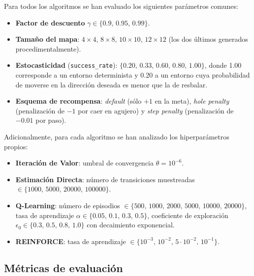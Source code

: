 \documentclass[11pt,a4paper]{article}
\begin{document}
Para todos los algoritmos se han evaluado los siguientes parámetros comunes:
\begin{itemize}
  \item \textbf{Factor de descuento} $\gamma \in \{0.9,\, 0.95,\, 0.99\}$.
  \item \textbf{Tamaño del mapa}: $4\times 4,\, 8\times 8,\, 10\times 10,\, 12\times 12$ (los dos últimos generados procedimentalmente).
  \item \textbf{Estocasticidad} (\texttt{success\_rate}): $\{0.20,\, 0.33,\, 0.60,\, 0.80,\, 1.00\}$, donde 1.00 corresponde a un entorno determinista y 0.20 a un entorno cuya probabilidad de moverse en la dirección deseada es menor que la de resbalar.
  \item \textbf{Esquema de recompensa}: \emph{default} (sólo $+1$ en la meta), \emph{hole penalty} (penalización de $-1$ por caer en agujero) y \emph{step penalty} (penalización de $-0.01$ por paso).
\end{itemize}
Adicionalmente, para cada algoritmo se han analizado los hiperparámetros propios:
\begin{itemize}
  \item \textbf{Iteración de Valor}: umbral de convergencia $\theta = 10^{-6}$.
  \item \textbf{Estimación Directa}: número de transiciones muestreadas $\in \{1000,\, 5000,\, 20000,\, 100000\}$.
  \item \textbf{Q-Learning}: número de episodios $\in \{500,\,1000,\,2000,\,5000,\,10000,\,20000\}$, tasa de aprendizaje $\alpha \in \{0.05,\, 0.1,\, 0.3,\, 0.5\}$, coeficiente de exploración $\epsilon_0 \in \{0.3,\, 0.5,\, 0.8,\, 1.0\}$ con decaimiento exponencial.
  \item \textbf{REINFORCE}: tasa de aprendizaje $\in \{10^{-3},\, 10^{-2},\, 5\!\cdot\!10^{-2},\, 10^{-1}\}$.
\end{itemize}

\subsection{Métricas de evaluación}
\end{document}
